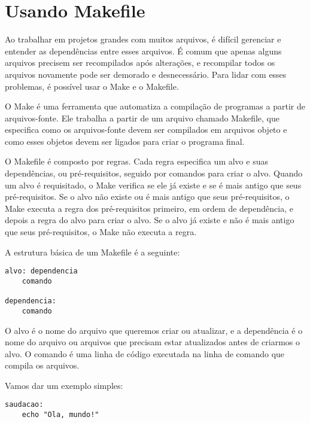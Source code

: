 \section{Usando Makefile}

Ao trabalhar em projetos grandes com muitos arquivos, é difícil gerenciar e entender as dependências entre esses arquivos. É comum que apenas alguns arquivos precisem ser recompilados após alterações, e recompilar todos os arquivos novamente pode ser demorado e desnecessário. Para lidar com esses problemas, é possível usar o Make e o Makefile.

O Make é uma ferramenta que automatiza a compilação de programas a partir de arquivos-fonte. Ele trabalha a partir de um arquivo chamado Makefile, que especifica como os arquivos-fonte devem ser compilados em arquivos objeto e como esses objetos devem ser ligados para criar o programa final.

O Makefile é composto por regras. Cada regra especifica um alvo e suas dependências, ou pré-requisitos, seguido por comandos para criar o alvo. Quando um alvo é requisitado, o Make verifica se ele já existe e se é mais antigo que seus pré-requisitos. Se o alvo não existe ou é mais antigo que seus pré-requisitos, o Make executa a regra dos pré-requisitos primeiro, em ordem de dependência, e depois a regra do alvo para criar o alvo. Se o alvo já existe e não é mais antigo que seus pré-requisitos, o Make não executa a regra.

A estrutura básica de um Makefile é a seguinte:

\begin{scriptsize}
\estilobash
\begin{lstlisting}
alvo: dependencia
    comando

dependencia:
    comando
\end{lstlisting}
\end{scriptsize}

O alvo é o nome do arquivo que queremos criar ou atualizar, e a dependência é o nome do arquivo ou arquivos que precisam estar atualizados antes de criarmos o alvo. O comando é uma linha de código executada na linha de comando que compila os arquivos.

Vamos dar um exemplo simples:

\begin{scriptsize}
\estilobash
\begin{lstlisting}
saudacao:
    echo "Ola, mundo!"
\end{lstlisting}
\end{scriptsize}


